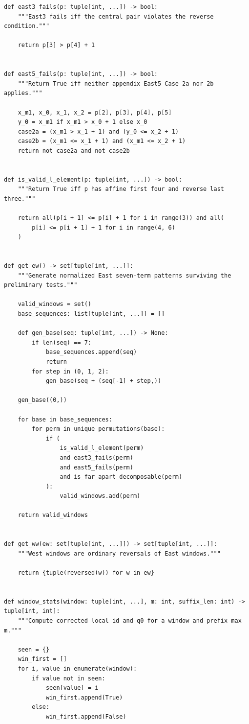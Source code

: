 \documentclass[11pt]{article}
\theoremstyle{plain}
\theoremstyle{definition}
\theoremstyle{remark}
\begin{document}
\begin{lstlisting}
def east3_fails(p: tuple[int, ...]) -> bool:
    """East3 fails iff the central pair violates the reverse condition."""

    return p[3] > p[4] + 1


def east5_fails(p: tuple[int, ...]) -> bool:
    """Return True iff neither appendix East5 Case 2a nor 2b applies."""

    x_m1, x_0, x_1, x_2 = p[2], p[3], p[4], p[5]
    y_0 = x_m1 if x_m1 > x_0 + 1 else x_0
    case2a = (x_m1 > x_1 + 1) and (y_0 <= x_2 + 1)
    case2b = (x_m1 <= x_1 + 1) and (x_m1 <= x_2 + 1)
    return not case2a and not case2b


def is_valid_l_element(p: tuple[int, ...]) -> bool:
    """Return True iff p has affine first four and reverse last three."""

    return all(p[i + 1] <= p[i] + 1 for i in range(3)) and all(
        p[i] <= p[i + 1] + 1 for i in range(4, 6)
    )


def get_ew() -> set[tuple[int, ...]]:
    """Generate normalized East seven-term patterns surviving the preliminary tests."""

    valid_windows = set()
    base_sequences: list[tuple[int, ...]] = []

    def gen_base(seq: tuple[int, ...]) -> None:
        if len(seq) == 7:
            base_sequences.append(seq)
            return
        for step in (0, 1, 2):
            gen_base(seq + (seq[-1] + step,))

    gen_base((0,))

    for base in base_sequences:
        for perm in unique_permutations(base):
            if (
                is_valid_l_element(perm)
                and east3_fails(perm)
                and east5_fails(perm)
                and is_far_apart_decomposable(perm)
            ):
                valid_windows.add(perm)

    return valid_windows


def get_ww(ew: set[tuple[int, ...]]) -> set[tuple[int, ...]]:
    """West windows are ordinary reversals of East windows."""

    return {tuple(reversed(w)) for w in ew}


def window_stats(window: tuple[int, ...], m: int, suffix_len: int) -> tuple[int, int]:
    """Compute corrected local id and q0 for a window and prefix max m."""

    seen = {}
    win_first = []
    for i, value in enumerate(window):
        if value not in seen:
            seen[value] = i
            win_first.append(True)
        else:
            win_first.append(False)


\end{lstlisting}
\end{document}

